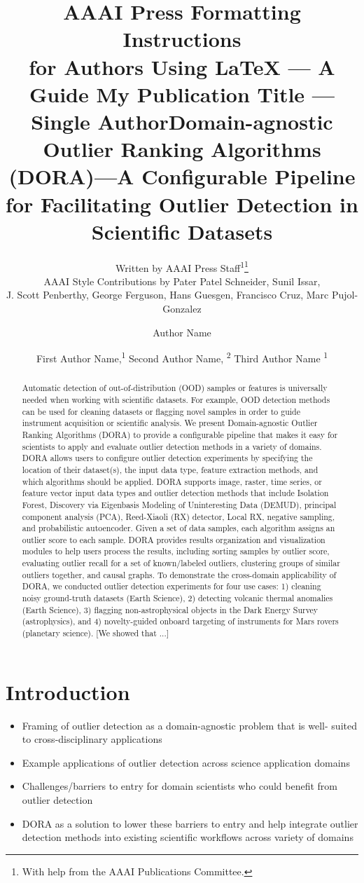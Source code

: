 \documentclass[letterpaper]{article} %
\title{AAAI Press Formatting Instructions \\for Authors Using \LaTeX{} --- A Guide }
\author{
    Written by AAAI Press Staff\textsuperscript{\rm 1}\thanks{With help from the AAAI Publications Committee.}\\
    AAAI Style Contributions by Pater Patel Schneider,
    Sunil Issar,  \\
    J. Scott Penberthy,
    George Ferguson,
    Hans Guesgen,
    Francisco Cruz,
    Marc Pujol-Gonzalez
    \\
}
\title{My Publication Title --- Single Author}
\author {
    Author Name \\
}
\title{Domain-agnostic Outlier Ranking Algorithms (DORA)---A Configurable Pipeline for Facilitating Outlier Detection in Scientific Datasets}
\author {
    First Author Name,\textsuperscript{\rm 1}
    Second Author Name, \textsuperscript{\rm 2}
    Third Author Name \textsuperscript{\rm 1} \\
}
\begin{document}
\maketitle

\begin{abstract}
Automatic detection of out-of-distribution (OOD) samples or features is
universally needed when working with scientific datasets. For example,
OOD detection methods can be used for cleaning datasets or flagging
novel samples in order to guide instrument acquisition or scientific analysis.
We present Domain-agnostic Outlier Ranking Algorithms (DORA) to provide
a configurable pipeline that makes it easy for scientists to apply and evaluate
outlier detection methods in a variety of domains. DORA allows users to 
configure outlier detection experiments by specifying the location of their 
dataset(s), the input data type, feature extraction methods, and which 
algorithms should be applied. DORA supports image, raster, time series, 
or feature vector input data types and outlier detection methods that include
 Isolation Forest, Discovery via Eigenbasis Modeling of Uninteresting Data 
 (DEMUD), principal component analysis (PCA), Reed-Xiaoli (RX) detector, 
 Local RX, negative sampling, and probabilistic autoencoder. Given a set of
  data samples, each algorithm assigns an outlier score to each sample. DORA
   provides results organization and visualization modules to help users 
   process the results, including sorting samples by outlier score, evaluating 
   outlier recall for a set of known/labeled outliers, clustering groups of 
   similar outliers together, and causal graphs. To demonstrate the 
   cross-domain applicability of DORA, we conducted outlier detection
    experiments for four use cases: 1) cleaning noisy ground-truth datasets
     (Earth Science), 2) detecting volcanic thermal anomalies (Earth Science), 
     3) flagging non-astrophysical objects in the Dark Energy Survey 
     (astrophysics), and 4) novelty-guided onboard targeting of instruments
      for Mars rovers (planetary science). [We showed that ...]
\end{abstract}

\section{Introduction}
\begin{itemize}
\item Framing of outlier detection as a domain-agnostic problem that is well-
suited to cross-disciplinary applications
\item Example applications of outlier detection across science application 
domains
\item Challenges/barriers to entry for domain scientists who could benefit from
 outlier detection 
\item DORA as a solution to lower these barriers to entry and help integrate 
outlier detection methods into existing scientific workflows across variety of 
domains
\end{itemize}
\end{document}
